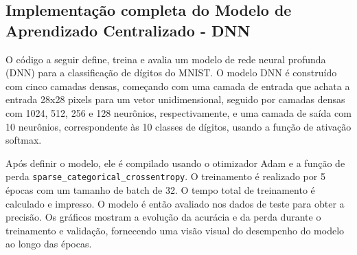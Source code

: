 \subsection{Implementação completa do Modelo de Aprendizado Centralizado - DNN}

O  código a seguir define, treina e avalia um modelo de rede neural profunda (DNN) para a classificação de dígitos do MNIST. O modelo DNN é construído com cinco camadas densas, começando com uma camada de entrada que achata a entrada 28x28 pixels para um vetor unidimensional, seguido por camadas densas com 1024, 512, 256 e 128 neurônios, respectivamente, e uma camada de saída com 10 neurônios, correspondente às 10 classes de dígitos, usando a função de ativação softmax.

Após definir o modelo, ele é compilado usando o otimizador Adam e a função de perda \texttt{sparse\_categorical\_crossentropy}. O treinamento é realizado por 5 épocas com um tamanho de batch de 32. O tempo total de treinamento é calculado e impresso. O modelo é então avaliado nos dados de teste para obter a precisão. Os gráficos mostram a evolução da acurácia e da perda durante o treinamento e validação, fornecendo uma visão visual do desempenho do modelo ao longo das épocas.


